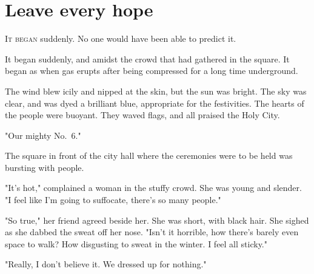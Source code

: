 
\chapter{Leave every hope}


\lettrine{I}{t began} suddenly. No one would have been able to predict it.

It began suddenly, and amidst the crowd that had gathered in the square.
It began as when gas erupts after being compressed for a long time
underground.

\clearpage


The wind blew icily and nipped at the skin, but the sun was bright. The
sky was clear, and was dyed a brilliant blue, appropriate for the
festivities. The hearts of the people were buoyant. They waved flags,
and all praised the Holy City.

"Our mighty No.~6."

The square in front of the city hall where the ceremonies were to be
held was bursting with people.

"It's hot," complained a woman in the stuffy crowd. She was young and
slender. "I feel like I'm going to suffocate, there's so many people."

"So true," her friend agreed beside her. She was short, with black hair.
She sighed as she dabbed the sweat off her nose. "Isn't it horrible, how
there's barely even space to walk? How disgusting to sweat in the
winter. I feel all sticky."

"Really, I don't believe it. We dressed up for nothing."

